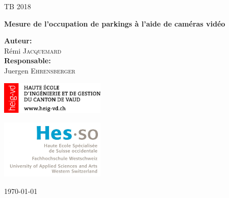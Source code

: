 \begin{titlepage}
    \begin{center}

    \vspace{2cm}

	{\Large TB 2018}\par
	 \vspace{0.5cm}
     {\LARGE \bf Mesure de l'occupation de parkings à l'aide de caméras vidéo}\par
     \vspace{3cm}
     \vfill
        
    \begin{flushleft} \large
        \textbf{Auteur:}\\
        Rémi \textsc{Jacquemard}\\
        \textbf{Responsable:} \\
        Juergen \textsc{Ehrensberger}\\
    \end{flushleft}

    
        \vfill
    \begin{minipage}{0.4\textwidth}
    	\begin{flushleft} \large
       		\includegraphics[width=5cm]{img/logo_heig.png}
        \end{flushleft}

	\end{minipage}
	\begin{minipage}{0.4\textwidth}
	    \begin{flushright}
			\includegraphics[width=5cm]{img/logo-hes-so.jpg}
		\end{flushright}
	\end{minipage}


        \today
        
    \end{center}
\end{titlepage}
